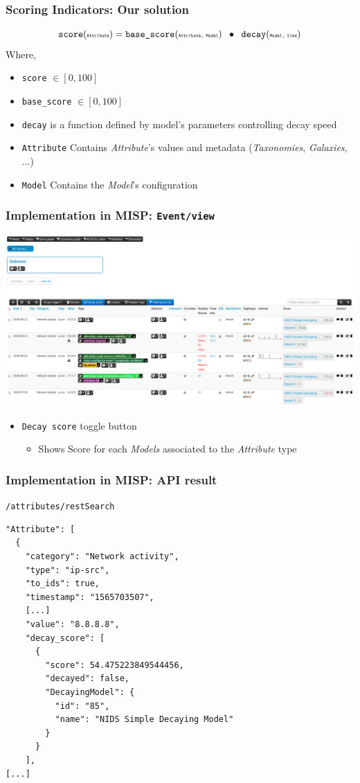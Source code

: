\begin{frame}
    \frametitle{Scoring Indicators: Our solution}
    $$ \texttt{score}(\texttt{\tiny Attribute}) = \texttt{base\_score}(\texttt{\tiny Attribute, Model}) \;\;\bullet\;\; \texttt{decay}(\texttt{\tiny Model, time}) $$
    Where,\vspace{0.5cm}
    \begin{itemize}
        \item \texttt{score} $ \in [0, 100] $
        \item \texttt{base\_score} $ \in [0, 100] $
        \item \texttt{decay} is a function defined by model's parameters controlling decay speed
        \item \texttt{Attribute} Contains \textit{Attribute}'s values and metadata {\scriptsize (\textit{Taxonomies}, \textit{Galaxies}, ...)}
        \item \texttt{Model} Contains the \textit{Model}'s configuration
    \end{itemize}
\end{frame}

\begin{frame}
    \frametitle{Implementation in MISP: \texttt{Event/view}}
    \includegraphics[width=1.00\linewidth]{decaying-event.png}
    \begin{itemize}
        \item \texttt{Decay score} toggle button
        \begin{itemize}
            \item Shows Score for each \textit{Models} associated to the \textit{Attribute} type
        \end{itemize}
    \end{itemize}
\end{frame}

\begin{frame}[fragile]
    \frametitle{Implementation in MISP: API result}
    \texttt{/attributes/restSearch}
    \begin{lstlisting}
"Attribute": [
  {
    "category": "Network activity",
    "type": "ip-src",
    "to_ids": true,
    "timestamp": "1565703507",
    [...]
    "value": "8.8.8.8",
    "decay_score": [
      {
        "score": 54.475223849544456,
        "decayed": false,
        "DecayingModel": {
          "id": "85",
          "name": "NIDS Simple Decaying Model"
        }
      }
    ],
[...]
    \end{lstlisting}
\end{frame}


